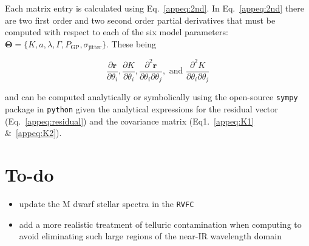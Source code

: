 Each matrix entry is calculated using Eq.~\ref{appeq:2nd}. In Eq.~\ref{appeq:2nd} there are
two first order and two second order partial derivatives that must be computed with respect to each of the six model parameters:
$\boldsymbol{\Theta} = \{K, a, \lambda, \Gamma, P_{\text{GP}}, \sigma_{\text{jitter}} \}$. These being

\begin{equation}
  \frac{\partial \mathbf{r}}{\partial \theta_i}, \frac{\partial K}{\partial \theta_i},
  \frac{\partial^2 \mathbf{r}}{\partial \theta_i \partial \theta_j}, \text{ and } \frac{\partial^2 K}{\partial \theta_i \partial \theta_j}  
\end{equation}
  
\noindent and can be computed analytically or symbolically using the open-source \texttt{sympy} package in \texttt{python} given the
analytical expressions for the residual vector (Eq.~\ref{appeq:residual}) and the covariance matrix (Eq1.~\ref{appeq:K1} \&~\ref{appeq:K2}).





\section{To-do}
\begin{itemize}
\item update the M dwarf stellar spectra in the \texttt{RVFC}
\item add a more realistic treatment of telluric contamination when computing \sigphot{} to avoid eliminating such 
large regions of the near-IR wavelength domain
\end{itemize}
